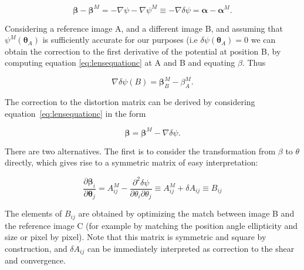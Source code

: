 \begin{equation}
\boldsymbol \beta - \boldsymbol \beta^M=-\nabla \psi - \nabla \psi^M \equiv -\nabla \delta \psi = \boldsymbol \alpha - \boldsymbol \alpha^M.
\label{eq:lensequationc}
\end{equation}

Considering a reference image A, and a different image B, and assuming that $\psi^M(\boldsymbol \theta_A)$ is sufficiently accurate for our purposes (i.e $\delta \psi (\boldsymbol \theta_A)=0$ we can obtain the correction to the first derivative of the potential at position B, by computing equation \ref{eq:lensequationc} at A and B and equating $\beta$. Thus

\begin{equation}
\nabla \delta \psi(B) = \boldsymbol \beta_B^M - \beta_A^M.
\label{eq:deflectionc}
\end{equation}

The correction to the distortion matrix can be derived by considering equation~\ref{eq:lensequationc} in the form

\begin{equation}
\boldsymbol \beta = \boldsymbol \beta^M -\nabla \delta \psi.
\label{eq:lensequationc2}
\end{equation}

There are two alternatives. The first is to consider the transformation from
$\beta$ to $\theta$ directly, which gives rise to a symmetric matrix of easy interpretation:


\begin{equation}
\frac{\partial \boldsymbol \beta_i}{\partial \boldsymbol \theta_j}=A^M_{ij}-\frac{\partial^2 \delta \psi}{\partial \theta_i \partial \theta_j} \equiv A^M_{ij}+\delta A_{ij} \equiv B_{ij}
\label{eq:magnificationc}
\end{equation}

The elements of $B_{ij}$ are obtained by optimizing the match between
image B and the reference image C (for example by matching the
position angle ellipticity and size or pixel by pixel). Note that this
matrix is symmetric and square by construction, and $\delta A_{ij}$
can be immediately interpreted as correction to the shear and
convergence.

